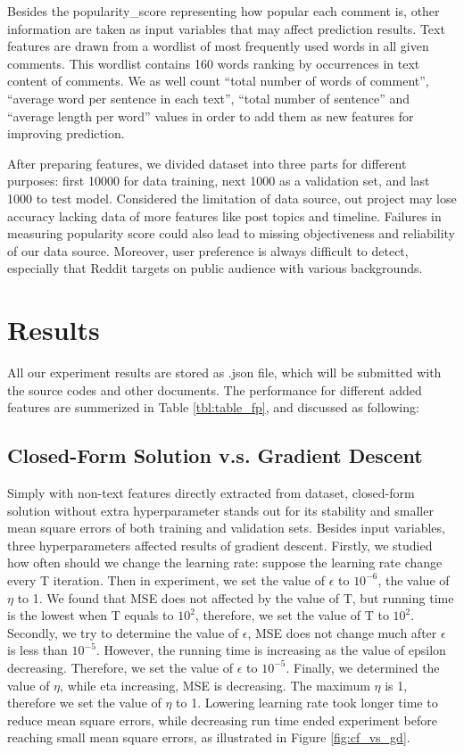 \documentclass[letterpaper, 11pt]{article}
\begin{document}
Besides the popularity\_score representing how popular each comment is, other information are taken as input variables that may affect prediction results. Text features are drawn from a wordlist of most frequently used words in all given comments. This wordlist contains 160 words ranking by occurrences in text content of comments. We as well count ``total number of words of comment'', ``average word per sentence in each text'', ``total number of sentence'' and ``average length per word'' values in order to add them as new features for improving prediction.

After preparing features, we divided dataset into three parts for different purposes: first 10000 for data training, next 1000 as a validation set, and last 1000 to test model. Considered the limitation of data source, out project may lose accuracy lacking data of more features like post topics and timeline. Failures in measuring popularity score could also lead to missing objectiveness and reliability of our data source. Moreover, user preference is always difficult to detect, especially that Reddit targets on public audience with various backgrounds.

\section*{Results}

All our experiment results are stored as .json file, which will be submitted with the source codes and other documents. The performance for different added features are summerized in Table \ref{tbl:table_fp}, and discussed as following:

\subsection*{Closed-Form Solution v.s. Gradient Descent}

Simply with non-text features directly extracted from dataset, closed-form solution without extra hyperparameter stands out for its stability and smaller mean square errors of both training and validation sets. Besides input variables, three hyperparameters affected results of gradient descent. Firstly, we studied how often should we change the learning rate: suppose the learning rate change every T iteration. Then in experiment, we set the value of $\epsilon$ to $10^{-6}$, the value of $\eta$ to 1. We found that MSE does not affected by the value of T, but running time is the lowest when T equals to $10^{2}$, therefore, we set the value of T to $10^{2}$. Secondly, we try to determine the value of $\epsilon$, MSE does not change much after $\epsilon$ is less than $10^{-5}$. However, the running time is increasing as the value of epsilon decreasing. Therefore, we set the value of $\epsilon$ to $10^{-5}$. Finally, we determined the value of $\eta$, while eta increasing, MSE is decreasing. The maximum $\eta$ is 1, therefore we set the value of $\eta$ to 1. Lowering learning rate took longer time to reduce mean square errors, while decreasing run time ended experiment before reaching small mean square errors, as illustrated in Figure \ref{fig:cf_vs_gd}. 
\end{document}
